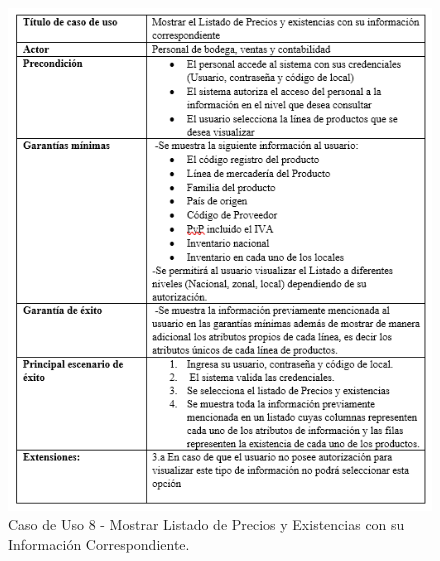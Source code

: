 \documentclass{scrreprt}
\begin{document}
\begin{figure}[!htpb]
    \centerline{\includegraphics[scale=.75]{images/case_stiff/stuff8.png}}
    \caption{Caso de Uso 8 - Mostrar Listado de Precios y Existencias con su Información Correspondiente.}
    \label{fig}
\end{figure}
\FloatBarrier
\end{document}
